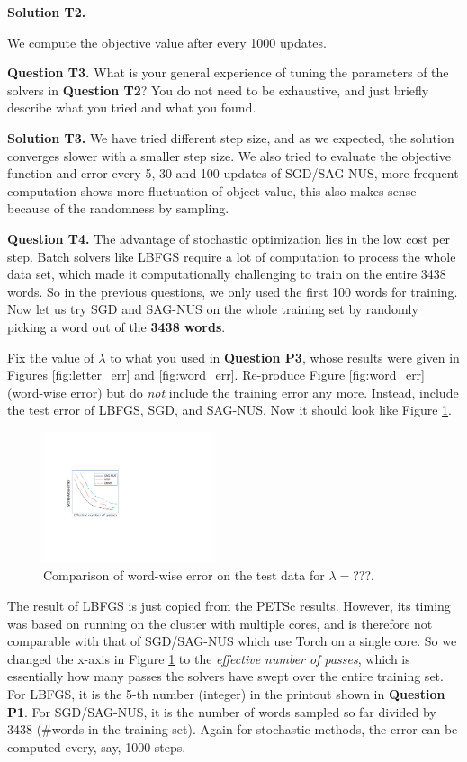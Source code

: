 \documentclass[11pt]{report}
\begin{document}
{\bf Solution T2.}

We compute the objective value after every 1000 updates. 

{\bf Question T3.}
What is your general experience of tuning the parameters of the solvers in {\bf Question T2}?
You do not need to be exhaustive, and just briefly describe what you tried and what you found.

{\bf Solution T3.}
We have tried different step size, and as we expected, the solution converges slower with a smaller step size.
We also tried to evaluate the objective function and error every 5, 30 and 100 updates of SGD/SAG-NUS, more frequent computation shows more fluctuation of object value, this also makes sense because of the randomness by sampling.

{\bf Question T4.}
The advantage of stochastic optimization lies in the low cost per step.
Batch solvers like LBFGS require a lot of computation to process the whole data set,
which made it computationally challenging to train on the entire 3438 words.
So in the previous questions, we only used the first 100 words for training.
Now let us try SGD and SAG-NUS on the whole training set by randomly picking a word out of the {\bf 3438 words}.

Fix the value of $\lambda$ to what you used in {\bf Question P3},
whose results were given in Figures \ref{fig:letter_err} and \ref{fig:word_err}.
Re-produce Figure \ref{fig:word_err} (word-wise error) but do \emph{not} include the training error any more.
Instead, include the test error of LBFGS, SGD, and SAG-NUS.
Now it should look like Figure \ref{fig:compare_word_err}.

\begin{figure}[t] 
\centering
\includegraphics[width=5cm]{error_Torch}
\caption{Comparison of word-wise error on the test data for $\lambda=$???.}
\label{fig:compare_word_err}
\end{figure}

The result of LBFGS is just copied from the PETSc results.
However, its timing was based on running on the cluster with multiple cores,
and is therefore not comparable with that of SGD/SAG-NUS which use Torch on a single core.
So we changed the x-axis in Figure \ref{fig:compare_word_err} to the \emph{effective number of passes}, which is essentially how many passes the solvers have swept over the entire training set.
For LBFGS, it is the 5-th number (integer) in the printout shown in {\bf Question P1}.
For SGD/SAG-NUS, it is the number of words sampled so far divided by 3438
(\#words in the training set).
Again for stochastic methods, the error can be computed every, say, 1000 steps.
\end{document}
